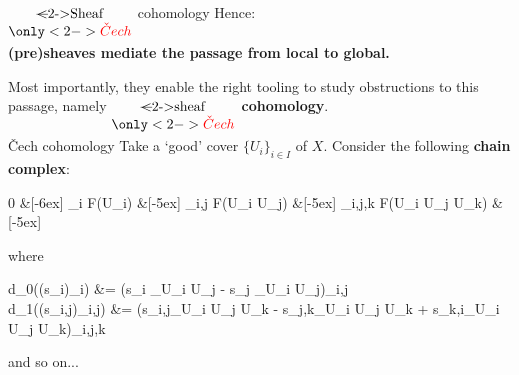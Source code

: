\begin{frame}{$\Underset{\only<2->{\color{red}\check{C}ech}}{\text{\sout<2->{Sheaf}}}$ cohomology}
	Hence:
	\begin{center}
	\bfseries
		(pre)sheaves mediate the passage from local to global.
	\end{center}

	Most importantly, they enable the right tooling to study obstructions to this passage, namely \textbf{$\Underset{\only<2->{\color{red}\check{C}ech}}{\text{\sout<2->{sheaf}}}$ cohomology}.

	\vfill

\end{frame}

\begin{frame}{\v{C}ech cohomology}
	Take a `good' cover $\{U_i\}_{i \in I}$ of $X$. 
	\vfill
	Consider the following \textbf{chain complex}: 
	\begin{diagram*}
		0  \&[-6ex] \prod_i F(U_i)  \&[-5ex] \prod_{i,j} F(U_i \cap U_j)  \&[-5ex] \prod_{i,j,k} F(U_i \cap U_j \cap U_k)  \&[-5ex] \cdots
	\end{diagram*}
	where
	\begin{eqalign*}
		d_0((s_i)_i) &= (s_i \vert_{U_i \cap U_j} - s_j \vert_{U_i \cap U_j})_{i,j}\\
		d_1((s_{i,j})_{i,j}) &= (s_{i,j}\vert_{U_i \cap U_j \cap U_k} - s_{j,k}\vert_{U_i \cap U_j \cap U_k} + s_{k,i}\vert_{U_i \cap U_j \cap U_k})_{i,j,k}
	\end{eqalign*}
	and so on...
	\vfill
\end{frame}

